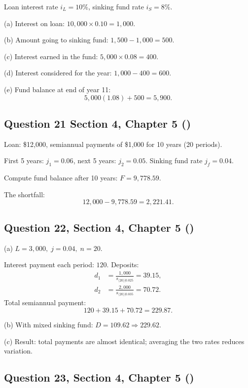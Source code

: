 \documentclass[12pt, a4paper]{article}
\newcommand{\angl}[1]{\langle #1 \rangle}
\begin{document}
Loan interest rate \( i_L = 10\% \), sinking fund rate \( i_S = 8\%. \)

(a) Interest on loan: \(10{,}000 \times 0.10 = 1{,}000.\)

(b) Amount going to sinking fund: \(1{,}500 - 1{,}000 = 500.\)

(c) Interest earned in the fund: \(5{,}000 \times 0.08 = 400.\)

(d) Interest considered for the year: \(1{,}000 - 400 = 600.\)

(e) Fund balance at end of year 11:
\[
5{,}000(1.08) + 500 = 5{,}900.
\]

\subsection*{Question 21 Section 4, Chapter 5  (\cite{toi3rd})}

Loan: \$12{,}000, semiannual payments of \$1{,}000 for 10 years (20 periods).

First 5 years: \(j_1 = 0.06\), next 5 years: \(j_2 = 0.05\).  
Sinking fund rate \(j_f = 0.04.\)

Compute fund balance after 10 years: \(F = 9{,}778.59.\)

The shortfall:
\[
12{,}000 - 9{,}778.59 = 2{,}221.41.
\]

\subsection*{Question 22, Section 4, Chapter 5  (\cite{toi3rd})}

(a) \( L = 3{,}000, \; j = 0.04, \; n = 20. \)

Interest payment each period: \(120.\)
Deposits:
\[
\begin{aligned}
d_1 &= \frac{1{,}000}{s_{\angl{20}|0.025}} = 39.15,\\
d_2 &= \frac{2{,}000}{s_{\angl{20}|0.035}} = 70.72.
\end{aligned}
\]
Total semiannual payment:
\[
120 + 39.15 + 70.72 = 229.87.
\]

(b) With mixed sinking fund: \(D = 109.62 \Rightarrow 229.62.\)

(c) Result: total payments are almost identical; averaging the two rates reduces variation.

\subsection*{Question 23, Section 4, Chapter 5  (\cite{toi3rd})}
\end{document}

